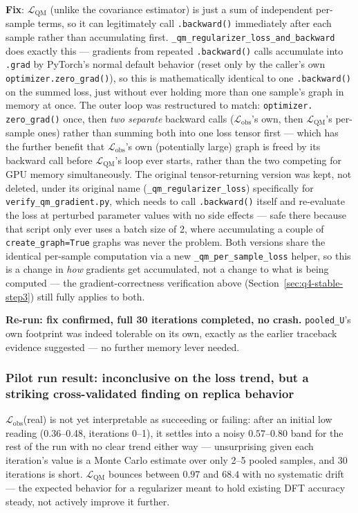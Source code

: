 \documentclass[11pt]{article}
\begin{document}
\textbf{Fix}: $\mathcal{L}_{\text{QM}}$ (unlike the covariance estimator)
is just a sum of independent per-sample terms, so it can legitimately call
\texttt{.backward()} immediately after each sample rather than
accumulating first. \texttt{\_qm\_regularizer\_loss\_and\_backward} does
exactly this --- gradients from repeated \texttt{.backward()} calls
accumulate into \texttt{.grad} by PyTorch's normal default behavior
(reset only by the caller's own \texttt{optimizer.zero\_grad()}), so this
is mathematically identical to one \texttt{.backward()} on the summed
loss, just without ever holding more than one sample's graph in memory at
once. The outer loop was restructured to match: \texttt{optimizer.
zero\_grad()} once, then \emph{two separate} backward calls
($\mathcal{L}_{\text{obs}}$'s own, then $\mathcal{L}_{\text{QM}}$'s
per-sample ones) rather than summing both into one loss tensor first ---
which has the further benefit that $\mathcal{L}_{\text{obs}}$'s own
(potentially large) graph is freed by its backward call before
$\mathcal{L}_{\text{QM}}$'s loop ever starts, rather than the two
competing for GPU memory simultaneously. The original tensor-returning
version was kept, not deleted, under its original name
(\texttt{\_qm\_regularizer\_loss}) specifically for
\texttt{verify\_qm\_gradient.py}, which needs to call \texttt{.backward()}
itself and re-evaluate the loss at perturbed parameter values with no side
effects --- safe there because that script only ever uses a batch size of
2, where accumulating a couple of \texttt{create\_graph=True} graphs was
never the problem. Both versions share the identical per-sample
computation via a new \texttt{\_qm\_per\_sample\_loss} helper, so this is
a change in \emph{how} gradients get accumulated, not a change to what is
being computed --- the gradient-correctness verification above
(Section~\ref{sec:q4-stable-step3}) still fully applies to both.

\textbf{Re-run: fix confirmed, full 30 iterations completed, no crash.}
\texttt{pooled\_U}'s own footprint was indeed tolerable on its own, exactly
as the earlier traceback evidence suggested --- no further memory lever
needed.

\subsubsection{Pilot run result: inconclusive on the loss trend, but a striking cross-validated finding on replica behavior}
\label{sec:q4-stable-pilot1}

$\mathcal{L}_{\text{obs}}$(real) is not yet interpretable as
succeeding or failing: after an initial low reading (0.36--0.48,
iterations 0--1), it settles into a noisy $0.57$--$0.80$ band for the rest
of the run with no clear trend either way --- unsurprising given each
iteration's value is a Monte Carlo estimate over only 2--5 pooled samples,
and 30 iterations is short. $\mathcal{L}_{\text{QM}}$ bounces between
$0.97$ and $68.4$ with no systematic drift --- the expected behavior for a
regularizer meant to hold existing DFT accuracy steady, not actively
improve it further.
\end{document}
